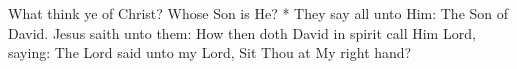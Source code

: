 What think ye of Christ? Whose Son is He? * They say all unto Him: The Son of David. Jesus saith unto them: How then doth David in spirit call Him Lord, saying: The Lord said unto my Lord, Sit Thou at My right hand?
